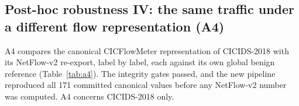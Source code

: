 \documentclass[preprint,12pt]{elsarticle}
\begin{document}
\subsection{Post-hoc robustness IV: the same traffic under a different flow representation (A4)}\label{sec:a4}

A4 compares the canonical CICFlowMeter representation of CICIDS-2018 with its NetFlow-v2 re-export, label by label, each against its own global benign reference (Table~\ref{tab:a4}). The integrity gates passed, and the new pipeline reproduced all 171 committed canonical values before any NetFlow-v2 number was computed. A4 concerns CICIDS-2018 only.

\end{document}
